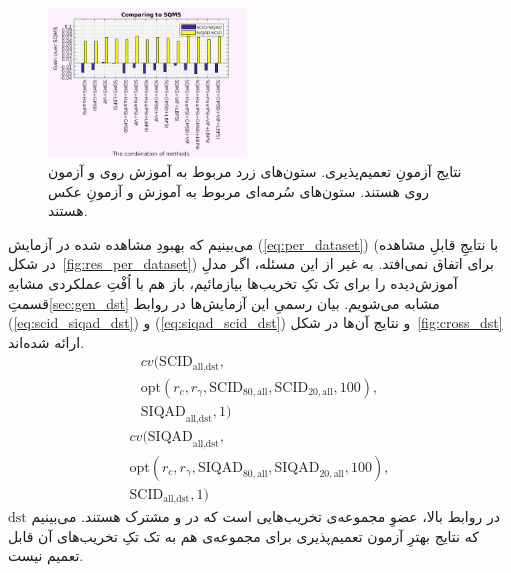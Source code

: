 \documentclass[twocolumn]{article}
\begin{document}
\begin{figure}
	\includegraphics[width=0.47\textwidth]{cross_whole.jpg}
	\caption{نتایج آزمونِ تعمیم‌پذیری. ستون‌های زرد مربوط به آموزش روی  و آزمون روی  هستند. ستون‌های سُرمه‌ای مربوط به آموزش و آزمونِ عکس هستند.}
	\label{fig:cross_dataset}
\end{figure}
می‌بینیم که بهبودِ مشاهده شده در آزمایش (\ref{eq:per_dataset}) (با نتایجِ قابلِ مشاهده در شکل~\ref{fig:res_per_dataset}) برای  اتفاق نمی‌افتد. به غیر از این مسئله، اگر مدلِ آموزش‌دیده را برای تک تکِ تخریب‌ها بیازمائیم، باز هم با اُفْتِ عملکردی مشابهِ قسمتِ\ref{sec:gen_dst} مشابه می‌شویم. بیان رسمیِ این آزمایش‌ها در روابط (\ref{eq:scid_siqad_dst}) و (\ref{eq:siqad_scid_dst}) و نتایج آن‌ها در شکل~\ref{fig:cross_dst} ارائه شده‌اند.
\begin{equation} 
	\begin{aligned} 
		\displaystyle cv(\text{SCID}_{\text{all}, \text{dst}}, \\
		\text{opt}(r_c, r_\gamma, \text{SCID}_{80, \text{all}}, \text{SCID}_{20, \text{all}}, 100),\\
		\text{SIQAD}_{\text{all}, \text{dst}}, 1)
	\end{aligned}
	\label{eq:scid_siqad_dst}
\end{equation}
\begin{equation} 
	\begin{aligned} 
		\displaystyle cv(\text{SIQAD}_{\text{all}, \text{dst}}, \\
		\text{opt}(r_c, r_\gamma, \text{SIQAD}_{80, \text{all}}, \text{SIQAD}_{20, \text{all}}, 100),\\
		\text{SCID}_{\text{all}, \text{dst}}, 1)
	\end{aligned}
	\label{eq:siqad_scid_dst}
\end{equation}
$\text{dst}$ در روابط بالا، عضوِ مجموعه‌ی تخریب‌هایی است که در  و  مشترک هستند. می‌بینیم که نتایج بهترِ آزمون تعمیم‌پذیری برای مجموعه‌ی  هم به تک تکِ تخریب‌های آن قابل تعمیم نیست.
\end{document}

